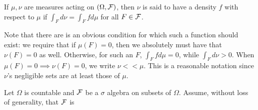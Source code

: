 \begin{definition}[Density]
    If $\mu,\nu$ are measures acting on $(\Omega, \mathcal F)$, then $\nu$ is said to have 
    a density $f$ with respect to $\mu$ if $\int_F d\nu = \int_F f d\mu$ for all 
    $F \in \mathcal F$. 
\end{definition}

Note that there are is an obvious condition for which such a function should exist: 
we require that if $\mu(F) = 0$, then we absolutely must have that $\nu(F) = 0$ as well. 
Otherwise, for such an $F$, $\int_F f d\mu = 0$, while $\int_F d\nu > 0$. When 
$\mu(F) = 0 \implies \nu(F) = 0$, we write $\nu << \mu$. This is a reasonable 
notation since $\nu$'s negligible sets are at least those of $\mu$. 

\begin{example}
    Let $\Omega$ is countable and $\mathcal F$ be a $\sigma$ algebra on subsets of 
    $\Omega$. Assume, without loss of generality, that $\mathcal F$ is 
\end{example}
